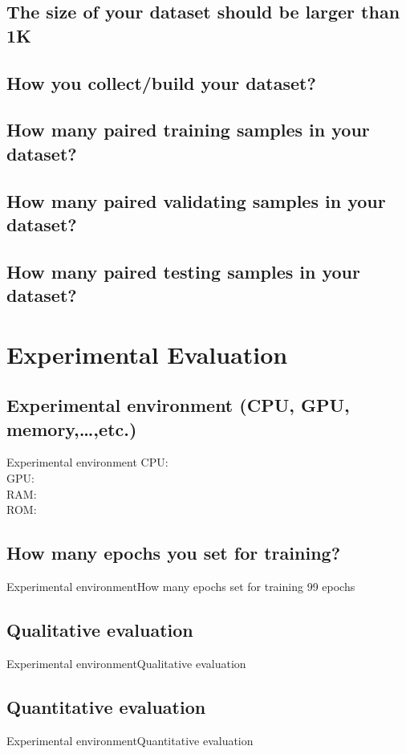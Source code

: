 \documentclass{beamer}
\begin{document}
\begin{CJK}{UTF8}{nkai}
\subsection{The size of your dataset should be larger than 1K}
\subsection{How you collect/build your dataset?}
\subsection{How many paired training samples in your dataset?}
\subsection{How many paired validating samples in your dataset?}
\subsection{How many paired testing samples in your dataset?}

\section{Experimental Evaluation}
\subsection{Experimental environment (CPU, GPU, memory,…,etc.)}
\begin{frame}{Experimental environment}
	CPU:\\
	GPU:\\
	RAM:\\
	ROM:\\
\end{frame}
\subsection{How many epochs you set for training?}
\begin{frame}{Experimental environment}{How many epochs set for training}
	99 epochs
\end{frame}
\subsection{Qualitative evaluation}
\begin{frame}{Experimental environment}{Qualitative evaluation}
	
\end{frame}
\subsection{Quantitative evaluation}
\begin{frame}{Experimental environment}{Quantitative evaluation}
	
\end{frame}





\end{CJK}
\end{document}
